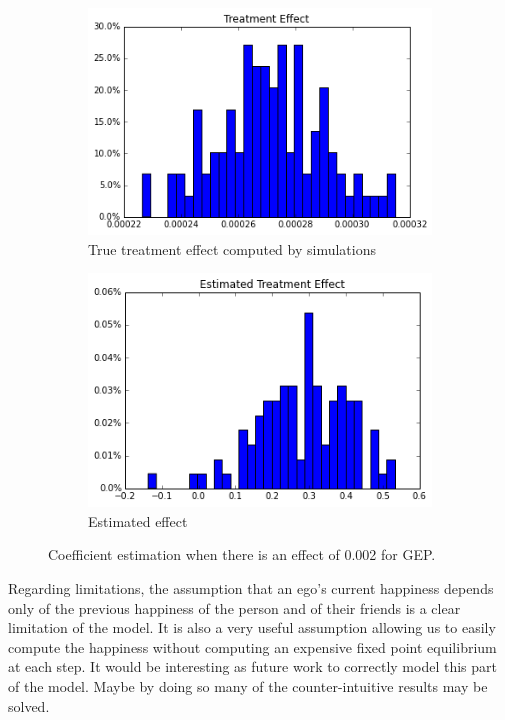 \documentclass[11pt]{article}
\begin{document}
\begin{figure}[h]
\centering
\begin{subfigure}{.5\textwidth}
  \centering
  \includegraphics[width=.9\linewidth]{treatment_effect_no_influence.png}
  \caption{True treatment effect computed by simulations}
  \label{fig:sub1}
\end{subfigure}%
\begin{subfigure}{.5\textwidth}
  \centering
  \includegraphics[width=.9\linewidth]{estimated_large_effect_gep.png}
  \caption{Estimated effect}
  \label{fig:sub2}
\end{subfigure}
\caption{Coefficient estimation when there is an effect of 0.002 for GEP.}
\label{fig:large_effect_gep}
\end{figure}

Regarding limitations, the assumption that an ego's current happiness depends only of the previous happiness of the person and of their friends is a clear limitation of the model. It is also a very useful assumption allowing us to easily compute the happiness without computing an expensive fixed point equilibrium at each step. It would be interesting as future work to correctly model this part of the model. Maybe by doing so many of the counter-intuitive results may be solved. \\
\end{document}

